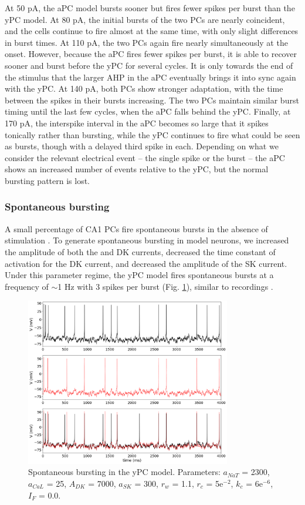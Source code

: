 \documentclass[12pt]{article}
\begin{document}
At 50 pA, the aPC model bursts sooner but fires fewer spikes per burst than the yPC model. At 80 pA, the initial bursts of the two PCs are nearly coincident, and the cells continue to fire almost at the same time, with only slight differences in burst times. At 110 pA, the two PCs again fire nearly simultaneously at the onset. However, because the aPC fires fewer spikes per burst, it is able to recover sooner and burst before the yPC for several cycles. It is only towards the end of the stimulus that the larger AHP in the aPC eventually brings it into sync again with the yPC. At 140 pA, both PCs show stronger adaptation, with the time between the spikes in their bursts increasing. The two PCs maintain similar burst timing until the last few cycles, when the aPC falls behind the yPC. Finally, at 170 pA, the interspike interval in the aPC becomes so large that it spikes tonically rather than bursting, while the yPC continues to fire what could be seen as bursts, though with a delayed third spike in each. Depending on what we consider the relevant electrical event -- the single spike or the burst -- the aPC shows an increased number of events relative to the yPC, but the normal bursting pattern is lost. 

\subsubsection{Spontaneous bursting}
A small percentage of CA1 PCs fire spontaneous bursts in the absence of stimulation \citep{jensen1994variant,jensen1996spike,su2001extracellular}. To generate spontaneous bursting in model neurons, we increased the amplitude of both the {\Na} and DK currents, decreased the time constant of activation for the DK current, and decreased the amplitude of the SK current. Under this parameter regime, the yPC model fires spontaneous bursts at a frequency of $\sim$1 Hz with 3 spikes per burst (Fig. \ref{fig:spontBurst}), similar to recordings \citep{golomb2006contribution}.

\begin{figure}[h!]
\centering
\includegraphics[width=0.8\textwidth]{figures/fig5.png}
\caption{Spontaneous bursting in the yPC model. Parameters: $a_{NaT}$ = 2300, $a_{CaL}$ = 25, $A_{DK}$ = 7000, $a_{SK}$ = 300, $r_{w}$ = 1.1, $r_{c}$ = 5e$^{-2}$, $k_{c}$ = 6e$^{-6}$, $I_{F}$ = 0.0.}
\label{fig:spontBurst}
\end{figure}
\end{document}
